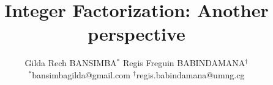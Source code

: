 \documentclass[sigconf,balance=false]{acmart}
\begin{document}
\title[Integer Factorization: Another perspective]{Integer Factorization: Another perspective}



\author{
    {\rm Gilda Rech BANSIMBA$^{*}$ \hspace{1em} Regis Freguin BABINDAMANA$^{\dagger}$\\ %
     $^{*}$bansimbagilda@gmail.com \hspace{1em} $^\dagger$regis.babindamana@umng.cg
}}
\end{document}
